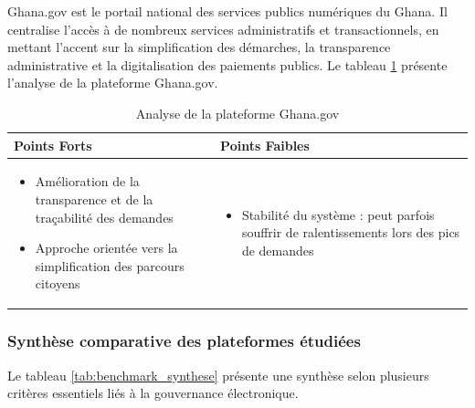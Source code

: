 Ghana.gov est le portail national des services publics numériques du Ghana. Il centralise l’accès à de nombreux services administratifs et transactionnels, en mettant l’accent sur la simplification des démarches, la transparence administrative et la digitalisation des paiements publics.  Le tableau \ref{tab:ghana_analysis} présente l'analyse de la plateforme Ghana.gov.

\begin{table}[H]
\centering


\setlength{\arrayrulewidth}{0.3pt}

\begin{tabular}{|p{}|p{}|}
\hline
\rowcolor{gray!30}
\textbf{Points Forts} & \textbf{Points Faibles} \\
\hline

 
\begin{itemize}
    \item Amélioration de la transparence et de la traçabilité des demandes
    \item Approche orientée vers la simplification des parcours citoyens
\end{itemize}
 
&
 
\begin{itemize}
    \item Stabilité du système : peut parfois souffrir de ralentissements lors des pics de demandes \parencite{ghana_portal_gaps}
\end{itemize}
 
\\
\hline

\end{tabular}

\caption{Analyse de la plateforme Ghana.gov}
\label{tab:ghana_analysis}
\end{table}




\subsubsection{Synthèse comparative des plateformes étudiées}

Le tableau \ref{tab:benchmark_synthese} présente une synthèse selon plusieurs critères essentiels liés à la gouvernance électronique.

\setlength{\arrayrulewidth}{0.3pt}


